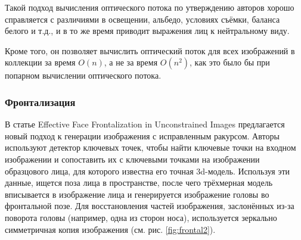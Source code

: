 Такой подход вычисления оптического потока по утверждению авторов хорошо справляется с различиями в освещении, альбедо, условиях съёмки, баланса белого и т.д., и в то же время приводит выражения лиц к нейтральному виду.

Кроме того, он позволяет вычислить оптический поток для всех изображений в коллекции за время $ O(n) $, а не за время $ O(n^2) $, как это было бы при попарном вычислении оптического потока.

\subsubsection{Фронтализация} 

В статье Effective Face Frontalization in Unconstrained Images \cite{frontalization} предлагается новый подход к генерации изображения с исправленным ракурсом. Авторы используют детектор ключевых точек, чтобы найти ключевые точки на входном изображении и сопоставить их с ключевыми точками на изображении образцового лица, для которого известна его точная 3d-модель. Используя эти данные, ищется поза лица в пространстве, после чего трёхмерная модель вписывается в изображение лица и генерируется изображение головы во фронтальной позе. Для восстановления частей изображения, заслонённых из-за поворота головы (например, одна из сторон носа), используется зеркально симметричная копия изображения (см. рис. \ref{fig:frontal2}).

